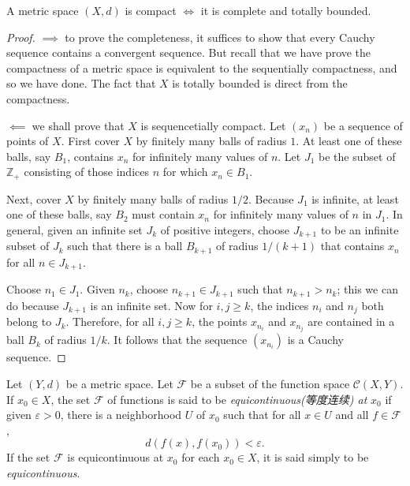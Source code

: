 \begin{theorem}
  A metric space \( (X, d) \) is compact \( \iff \) it is complete and totally bounded.
\end{theorem}
\begin{proof}
  \( \implies \) to prove the completeness, it suffices to show that every Cauchy sequence contains a convergent sequence.
  But recall that we have prove the compactness of a metric space is equivalent to the sequentially compactness, and so we have done.
  The fact that \( X \) is totally bounded is direct from the compactness.

  \( \impliedby \) we shall prove that \( X \) is sequencetially compact.
  Let \( (x_n) \) be a sequence of points of \( X \).
  First cover \( X \) by finitely many balls of radius \( 1 \).
  At least one of these balls, say \( B_1 \), contains \( x_n \) for infinitely many values of \( n \).
  Let \( J_1 \) be the subset of \( \mathbb{Z}_+ \) consisting of those indices \( n \) for which \( x_n \in B_1 \).

  Next, cover \( X \) by finitely many balls of radius \( 1 / 2 \).
  Because \( J_1 \) is infinite, at least one of these balls, say \( B_2 \) must contain \( x_n \) for infinitely many values of \( n \) in \( J_1 \).
  In general, given an infinite set \( J_k \) of positive integers, choose \( J_{k + 1} \) to be an infinite subset of \( J_k \) such that there is a ball \( B_{k + 1} \) of radius \( 1 / (k + 1) \) that contains \( x_n \) for all \( n \in J_{k + 1} \).

  Choose \( n_1 \in J_1 \).
  Given \( n_k \), choose \( n_{k + 1} \in J_{k + 1} \) such that \( n_{k + 1} > n_k \); this we can do because \( J_{k + 1} \) is an infinite set.
  Now for \( i, j \geq k \), the indices \( n_i \) and \( n_j \) both belong to \( J_k \).
  Therefore, for all \( i, j \geq k \), the points \( x_{n_i} \) and \( x_{n_j} \) are contained in a ball \( B_k \) of radius \( 1 / k \).
  It follows that the sequence \( (x_{n_i}) \) is a Cauchy sequence.
\end{proof}

\begin{definition}
  Let \( (Y, d) \) be a metric space.
  Let \( \mathcal{F} \) be a subset of the function space \( \mathcal{C}(X, Y) \).
  If \( x_0 \in X \), the set \( \mathcal{F} \) of functions is said to be \emph{equicontinuous(等度连续) at} \( x_0 \) if given \( \varepsilon > 0 \), there is a neighborhood \( U \) of \( x_0 \) such that for all \( x \in U \) and all \( f \in \mathcal{F} \),
  \[
    d(f(x), f(x_0)) < \varepsilon.
  \]
  If the set \( \mathcal{F} \) is equicontinuous at \( x_0 \) for each \( x_0 \in X \), it is said simply to be \emph{equicontinuous}.
\end{definition}

